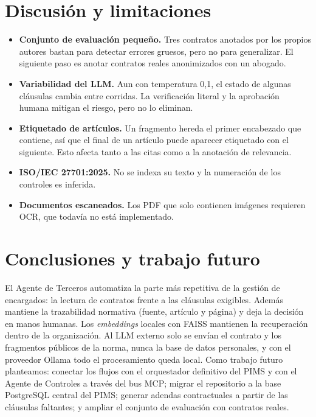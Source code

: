 \documentclass[conference]{IEEEtran}
\begin{document}
\section{Discusión y limitaciones}
\begin{itemize}
  \item \textbf{Conjunto de evaluación pequeño.} Tres contratos anotados por los propios autores bastan para detectar errores gruesos, pero no para generalizar. El siguiente paso es anotar contratos reales anonimizados con un abogado.
  \item \textbf{Variabilidad del LLM.} Aun con temperatura 0{,}1, el estado de algunas cláusulas cambia entre corridas. La verificación literal y la aprobación humana mitigan el riesgo, pero no lo eliminan.
  \item \textbf{Etiquetado de artículos.} Un fragmento hereda el primer encabezado que contiene, así que el final de un artículo puede aparecer etiquetado con el siguiente. Esto afecta tanto a las citas como a la anotación de relevancia.
  \item \textbf{ISO/IEC 27701:2025.} No se indexa su texto y la numeración de los controles es inferida.
  \item \textbf{Documentos escaneados.} Los PDF que solo contienen imágenes requieren OCR, que todavía no está implementado.
\end{itemize}

\section{Conclusiones y trabajo futuro}
El Agente de Terceros automatiza la parte más repetitiva de la gestión de encargados: la lectura de contratos frente a las cláusulas exigibles. Además mantiene la trazabilidad normativa (fuente, artículo y página) y deja la decisión en manos humanas. Los \emph{embeddings} locales con FAISS mantienen la recuperación dentro de la organización. Al LLM externo solo se envían el contrato y los fragmentos públicos de la norma, nunca la base de datos personales, y con el proveedor Ollama todo el procesamiento queda local. Como trabajo futuro planteamos: conectar los flujos con el orquestador definitivo del PIMS y con el Agente de Controles a través del bus MCP; migrar el repositorio a la base PostgreSQL central del PIMS; generar adendas contractuales a partir de las cláusulas faltantes; y ampliar el conjunto de evaluación con contratos reales.



\end{document}
